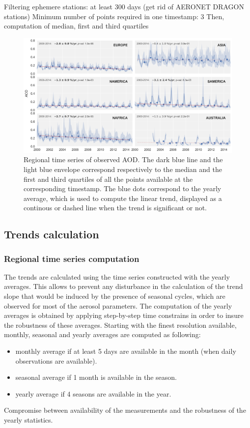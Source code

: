 \documentclass[journal abbreviation, manuscript]{copernicus}
\begin{document}
Filtering ephemere stations: at least 300 days (get rid of AERONET DRAGON stations)
Minimum number of points required in one timestamp: 3
Then, computation of median, first and third quartiles
\begin{figure}
 \includegraphics[width=16cm]{../scripts/figs/ts/panel-od550aer.png}
 \caption{Regional time series of observed AOD. The dark blue line and the light blue envelope correspond respectively to the median and the first and third quartiles of all the points available at the corresponding timestamp. The blue dots correspond to the yearly average, which is used to compute the linear trend, displayed as a continous or dashed line when the trend is significant or not.}
 \label{ts_aod}
\end{figure}



\subsection{Trends calculation}

\subsubsection{Regional time series computation}
The trends are calculated using the time series constructed with the yearly averages. This allows to prevent any disturbance in the calculation of the trend slope that would be induced by the presence of seasonal cycles, which are observed for most of the aerosol parameters. The computation of the yearly averages is obtained by applying step-by-step time constrains in order to insure the robustness of these averages. Starting with the finest resolution available, monthly, seasonal and yearly averages are computed as following:
\begin{itemize}
 \item monthly average if at least 5 days are available in the month (when daily observations are available).
 \item seasonal average if 1 month is available in the season.
 \item yearly average if 4 seasons are available in the year.
\end{itemize}
Compromise between availability of the measurements and the robustness of the yearly statistics.
\end{document}
